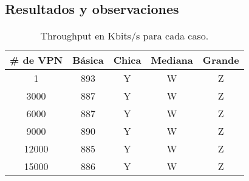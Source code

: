 \subsection{Resultados y observaciones}

\begin{table}[ht]
	\caption{Throughput en Kbits/s para cada caso.}
	\centering 
	\begin{tabular}{c c c c c}
		\hline\hline
		\# de VPN & Básica & Chica & Mediana  & Grande \\ [0.5ex]
		\hline
		1 & 893 & Y & W & Z \\
		3000 & 887 & Y & W & Z  \\
		6000 & 887 & Y & W & Z \\
		9000 & 890 & Y & W & Z \\
		12000 & 885 & Y & W & Z \\
		15000 & 886 & Y & W & Z \\ [1ex]
		\hline
	\end{tabular}
	\label{table:escala_de_servicios}
\end{table}

